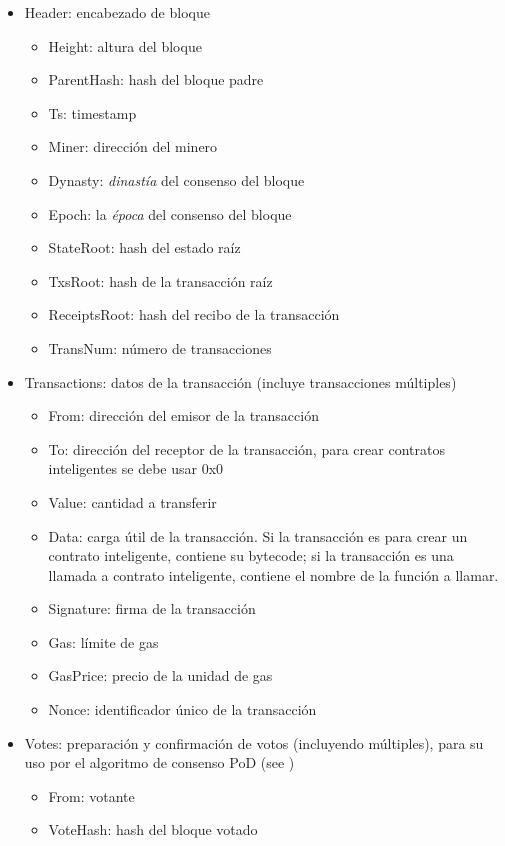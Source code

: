 \begin{itemize}
	\item Header: encabezado de bloque
		\begin{itemize}
		\item Height: altura del bloque
		\item ParentHash: hash del bloque padre
		\item Ts: timestamp
		\item Miner: dirección del minero
		\item Dynasty: \textit{dinastía} del consenso del bloque
		\item Epoch: la \textit{época} del consenso del bloque
		\item StateRoot: hash del estado raíz
		\item TxsRoot: hash de la transacción raíz
		\item ReceiptsRoot: hash del recibo de la transacción
		\item TransNum: número de transacciones
		\end{itemize}
	\item Transactions: datos de la transacción (incluye transacciones múltiples)
		\begin{itemize}
		\item From: dirección del emisor de la transacción
		\item To: dirección del receptor de la transacción, para crear contratos inteligentes se debe usar 0x0
		\item Value: cantidad a transferir
		\item Data: carga útil de la transacción. Si la transacción es para crear un contrato inteligente, contiene su bytecode; si la transacción es una llamada a contrato inteligente, contiene el nombre de la función a llamar.
		\item Signature: firma de la transacción
		\item Gas: límite de gas
		\item GasPrice: precio de la unidad de gas
		\item Nonce: identificador único de la transacción
		\end{itemize}
	\item Votes: preparación y confirmación de votos (incluyendo múltiples), para su uso por el algoritmo de consenso PoD (see )
		\begin{itemize}
		\item From: votante
		\item VoteHash: hash del bloque votado

\end{itemize}
\end{itemize}
